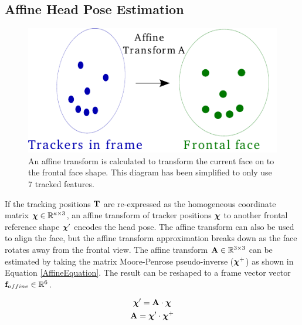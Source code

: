 
\subsection{Affine Head Pose Estimation}

\begin{figure}[tb]
\centering
\includegraphics[width = 0.5 \columnwidth]{nvcclass/affine-transform.pdf}
\caption{An affine transform is calculated to transform the current face on to the frontal face shape. This diagram has been simplified to only use 7 tracked features. }
\label{FigureAffineHeadPose}
\end{figure}

If the tracking positions $\textbf{T}$ are re-expressed as the homogeneous coordinate matrix ${\boldsymbol\chi} \in \mathbb{R}^{\kappa \times 3}$, an affine transform of tracker positions $\boldsymbol\chi$ to another frontal reference shape $\boldsymbol\chi'$ encodes the head pose.
The affine transform can also be used to align the face, but the affine transform approximation breaks down as the face rotates away from the frontal view.
The affine transform $\textbf{A} \in \mathbb{R} ^ {3 \times 3}$ can be estimated by taking the matrix Moore-Penrose pseudo-inverse ($\boldsymbol\chi^{+}$) as shown in Equation \ref{AffineEquation}. The result can be reshaped to a frame vector vector $\textbf{f}_{affine} \in \mathbb{R} ^ {6}$.

\begin{gather}
\boldsymbol\chi' = \textbf{A} \cdot \boldsymbol\chi \\
\textbf{A} = \boldsymbol\chi' \cdot \boldsymbol\chi^{+}
\label {AffineEquation}
\end{gather}

